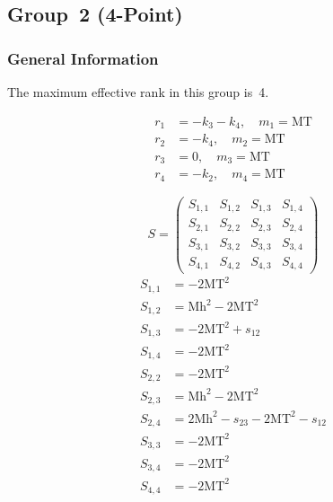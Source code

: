 \documentclass[a4paper]{article}
\begin{document}

\subsection{Group~2 (4-Point)}
\subsubsection*{General Information}
The maximum effective rank in this group is~4.

\begin{subequations}
\begin{align}
r_{1} &= -k_{3}-k_{4},\quad m_{1} = \text{MT}\\
r_{2} &= -k_{4},\quad m_{2} = \text{MT}\\
r_{3} &= 0,\quad m_{3} = \text{MT}\\
r_{4} &= -k_{2},\quad m_{4} = \text{MT}
\end{align}
\end{subequations}

\begin{equation}
S=\left(\begin{array}{cccc}
   S_{1,1}&
   S_{1,2}&
   S_{1,3}&
   S_{1,4}\\
   S_{2,1}&
   S_{2,2}&
   S_{2,3}&
   S_{2,4}\\
   S_{3,1}&
   S_{3,2}&
   S_{3,3}&
   S_{3,4}\\
   S_{4,1}&
   S_{4,2}&
   S_{4,3}&
   S_{4,4}\end{array}\right)
\end{equation}
\begin{subequations}
\begin{align}
   S_{1,1}&=-2\text{MT}^2\\
   S_{1,2}&=\text{Mh}^2-2\text{MT}^2\\
   S_{1,3}&=-2\text{MT}^2+s_{12}\\
   S_{1,4}&=-2\text{MT}^2\\
   S_{2,2}&=-2\text{MT}^2\\
   S_{2,3}&=\text{Mh}^2-2\text{MT}^2\\
   S_{2,4}&=2\text{Mh}^2-s_{23}-2\text{MT}^2-s_{12}\\
   S_{3,3}&=-2\text{MT}^2\\
   S_{3,4}&=-2\text{MT}^2\\
   S_{4,4}&=-2\text{MT}^2
\end{align}
\end{subequations}
\end{document}

